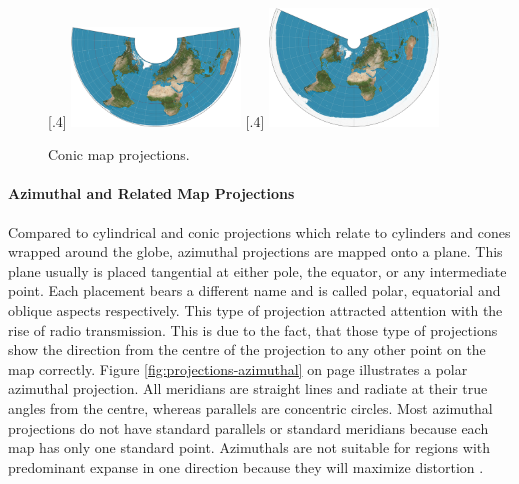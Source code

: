 \begin{figure}[!htb]
    \centering
  [.4\linewidth]
    {
        \includegraphics[width=0.4\textwidth,keepaspectratio]
        {images/methods/projections/albers.jpg}
    }
    \qquad
    [.4\linewidth]
    {
        \includegraphics[width=0.4\textwidth,keepaspectratio]
        {images/methods/projections/equidistant.jpg}
    }

    \caption{Conic map projections.}
\end{figure}

\paragraph{Azimuthal and Related Map Projections}
Compared to cylindrical and conic projections which relate to cylinders and cones wrapped around the globe, azimuthal projections are mapped onto a plane. This plane usually is placed tangential at either pole, the equator, or any intermediate point. Each placement bears a different name and is called polar, equatorial and oblique aspects respectively. This type of projection attracted attention with the rise of radio transmission. This is due to the fact, that those type of projections show the direction from the centre of the projection to any other point on the map correctly. Figure \ref{fig:projections-azimuthal} on page \pageref{fig:projections-azimuthal} illustrates a polar azimuthal projection. All meridians are straight lines and radiate at their true angles from the centre, whereas parallels are concentric circles. Most azimuthal projections do not have standard parallels or standard meridians because each map has only one standard point. Azimuthals are not suitable for regions with predominant expanse in one direction because they will maximize distortion .

